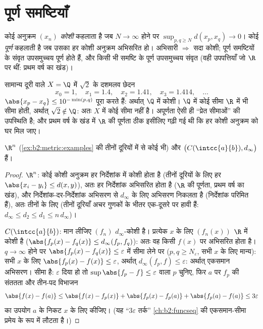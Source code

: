 \section{पूर्ण समष्टियाँ}

\begin{definition}\label{def:b2:metric:complete}
कोई अनुक्रम $(x_n)$ \emph{कोशी} कहलाता है जब $N \to \infty$ होने पर $\sup_{p, q \geq N} d(x_p,
x_q) \to 0$। कोई  \emph{पूर्ण} कहलाती है जब उसका हर कोशी
अनुक्रम अभिसरित हो। अभिसारी $\Rightarrow$ सदा कोशी; पूर्ण समष्टियों के संवृत
उपसमुच्चय पूर्ण होते हैं, और किसी भी समष्टि के पूर्ण उपसमुच्चय संवृत
(वही उपपत्तियाँ जो $\R$ पर थीं: प्रथम वर्ष का खंड)।
\end{definition}

\begin{example}[कोशी, पर बिना सीमा के]\label{ex:b2:metric:cauchynolimit}
सामान्य दूरी वाले $X = \Q$ में $\sqrt2$ के दशमलव छेदन
\[
x_0 = 1,\quad x_1 = 1.4,\quad x_2 = 1.41,\quad x_3 = 1.414,
\quad\dots
\]
$\abs{x_p - x_q} \leq 10^{-\min(p,q)}$ पूरा करते हैं: अर्थात् $\Q$ में कोशी। $\Q$ में कोई सीमा $\R$ में भी
सीमा होती, अर्थात् $\sqrt2 \notin \Q$: अतः $X$ में कोई सीमा नहीं है। अपूर्णता ऐसी ही
``प्रेत सीमाओं'' की उपस्थिति है; और प्रथम वर्ष के खंड में $\R$ की
पूर्णता ठीक इसीलिए गढ़ी गई थी कि हर कोशी अनुक्रम को घर मिल जाए।
\end{example}

\begin{theorem}\label{thm:b2:metric:rncomplete}
$\R^n$ (\cref{ex:b2:metric:examples} की तीनों दूरियों में से कोई भी) और $\bigl(C(\intcc{a}{b}),
d_\infty\bigr)$  हैं।
\end{theorem}

\begin{proof}
$\R^n$: कोई कोशी अनुक्रम हर निर्देशांक में कोशी होता है (तीनों दूरियों के
लिए हर $\abs{x_i - y_i} \leq d(x,y)$), अतः हर निर्देशांक अभिसरित होता है ($\R$ की पूर्णता, प्रथम
वर्ष का खंड), और निर्देशांक-दर-निर्देशांक अभिसरण से $d_\infty$ के लिए अभिसरण
निकलता है (निर्देशांक परिमित हैं), अतः तीनों के लिए (तीनों दूरियाँ अचर
गुणकों के भीतर एक-दूसरे पर हावी हैं: $d_\infty
\leq d_2 \leq d_1 \leq n\,d_\infty$)।

$C(\intcc{a}{b})$: मान लीजिए $(f_n)$ $d_\infty$-कोशी है। प्रत्येक $x$ के लिए $(f_n(x))$ $\R$ में कोशी है
($\abs{f_p(x) - f_q(x)} \leq
d_\infty(f_p, f_q)$): अतः वह किसी $f(x)$ पर अभिसरित होता है। $q \to \infty$ होने पर $\abs{f_p(x) - f_q(x)} \leq \varepsilon$ में सीमा
लेने पर ($p, q
\geq N_\varepsilon$, सभी $x$ के लिए मान्य): सभी $x$ के लिए $\abs{f_p(x) -
f(x)} \leq \varepsilon$, अर्थात्
$d_\infty(f_p, f) \leq
\varepsilon$: अर्थात् एकसमान अभिसरण। सीमा  है: $\varepsilon$ दिया हो तो $\sup\abs{f_p - f} \leq \varepsilon$ वाला
$p$ चुनिए, फिर $a$ पर $f_p$ की संततता और तीन-पद विभाजन
\[
\abs{f(x) - f(a)} \leq \abs{f(x) - f_p(x)} + \abs{f_p(x) - f_p(a)}
+ \abs{f_p(a) - f(a)} \leq 3\varepsilon
\]
का उपयोग $a$ के निकट $x$ के लिए कीजिए। (यह ``$3\varepsilon$ तर्क'' \cref{ch:b2:funcseq} की
एकसमान-सीमा प्रमेय के रूप में लौटता है।)
\end{proof}

